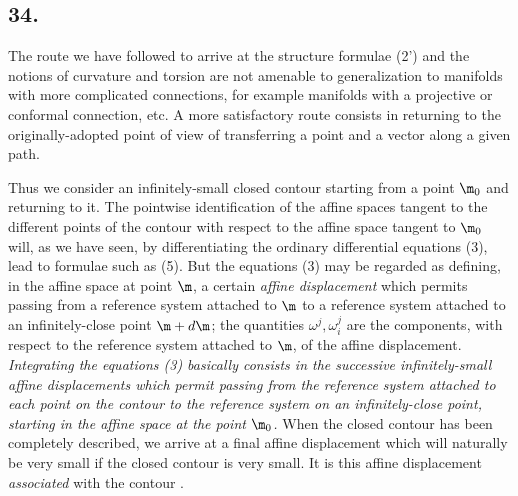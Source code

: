 \subsection*{34.}


The route we have followed to arrive at the structure formulae (2') and the notions of curvature and torsion are not amenable to generalization to manifolds with more complicated connections, for example manifolds with a projective or conformal connection, etc. A more satisfactory route consists in returning to the originally-adopted point of view of transferring a point and a vector along a given path.

Thus we consider an infinitely-small closed contour starting from a point $\m_0$ and returning to it. The pointwise identification of the affine spaces tangent to the different points of the contour with respect to the affine space tangent to $\m_0$ will, as we have seen, by differentiating the ordinary differential equations (3), lead to formulae such as (5). But the equations (3) may be regarded as defining, in the affine space at point $\m$, a certain \textit{affine displacement} which permits passing from a reference system attached to $\m$ to a reference system attached to an infinitely-close point $\m + d\m$; the quantities $\omega^j, \omega_i^j$  are  the components, with respect to the reference system attached to $\m$, of the affine displacement. \textit{Integrating the equations (3) basically consists in the successive infinitely-small affine displacements which permit passing from the reference system attached to each point on the contour to the reference system on an infinitely-close point, starting in the affine space at the point $\m_0$.} When the closed contour has been completely described, we arrive at a final affine displacement which will naturally be very small if the closed contour is very small. It is this affine displacement \textit{associated} with the contour .

